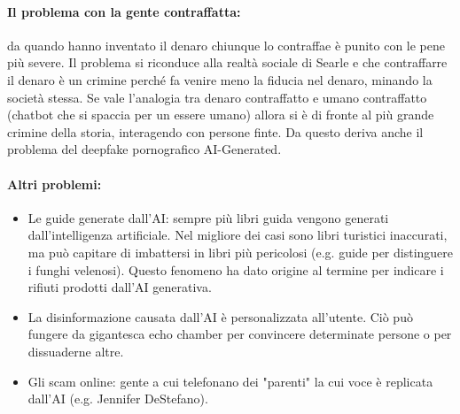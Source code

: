 \paragraph{Il problema con la gente contraffatta:} da quando hanno inventato il denaro chiunque lo contraffae è punito con le pene più severe. Il problema si riconduce alla realtà sociale di Searle e che contraffarre il denaro è un crimine perché fa venire meno la fiducia nel denaro, minando la società stessa. Se vale l'analogia tra denaro contraffatto e umano contraffatto (chatbot che si spaccia per un essere umano) allora si è di fronte al più grande crimine della storia, interagendo con persone finte. Da questo deriva anche il problema del deepfake pornografico AI-Generated. 

\paragraph{Altri problemi:}

\begin{itemize}
  \item Le guide generate dall'AI: sempre più libri guida vengono generati dall'intelligenza artificiale. Nel migliore dei casi sono libri turistici inaccurati, ma può capitare di imbattersi in libri più pericolosi (e.g. guide per distinguere i funghi velenosi). Questo fenomeno ha dato origine al termine  per indicare i rifiuti prodotti dall'AI generativa. 
  \item La disinformazione causata dall'AI è personalizzata all'utente. Ciò può fungere da gigantesca echo chamber per convincere determinate persone o per dissuaderne altre. 
  \item Gli scam online: gente a cui telefonano dei "parenti" la cui voce è replicata dall'AI (e.g. Jennifer DeStefano).
\end{itemize}





